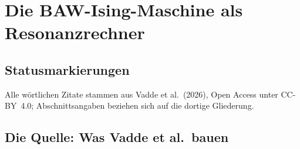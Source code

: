 
\providecommand{\BM}{\textbf{[B]}}
\providecommand{\KM}{\textbf{[K]}}
\providecommand{\SM}{\textbf{[S]}}
\providecommand{\SetzM}{\textbf{[SETZUNG]}}
\providecommand{\QM}{\textbf{[Q]}}

\chapter*{Die BAW-Ising-Maschine als Resonanzrechner}

\begin{abstract}
Vadde, Ovcharov, González, Khymyn, Litvinenko und Åkerman (Commun.\
Phys.~9:290, 8.~September 2026, Open Access) stellen eine
zeitmultiplexte Ising-Maschine mit 2048 Spins auf zwei Quarz-Volumen\-schall\-wellen-%
Verzögerungsleitungen vor. Dieses Dokument liest die Arbeit als
Fallstudie der FFGFT-Einordnung von Resonanzrechnern (Dok.~173, 328, 343):
Spins als Phasenzustände eines Ringoszillators, Barkhausen-Bedingung als
Wicklungsquantisierung, parametrische $\mathbb{Z}_2$-Selektion, Kopplungsregime
mit Chaosschwelle, und -- quantitativ am deutlichsten -- ein Auflösungsboden:
Näherungslösungen zu 99,9\,\% werden zuverlässig gefunden, exakte Lösungen
($E=0$) mit wachsender Problemgröße nicht mehr. Alle Zitate wörtlich \QM.
Status der Einordnungen: \SM.
\end{abstract}

\section*{Statusmarkierungen}


\noindent Alle wörtlichen Zitate stammen aus Vadde et al.\ (2026), Open Access
unter CC-BY~4.0; Abschnittsangaben beziehen sich auf die dortige Gliederung.

\section{Die Quelle: Was Vadde et al.\ bauen}

